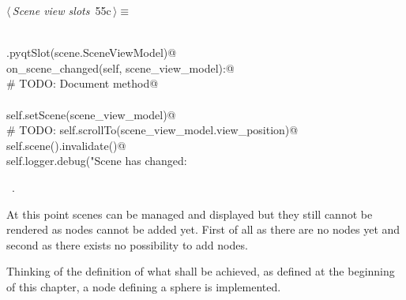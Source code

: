 \documentclass[
    a4paper,      %
    10pt,         %
    openright,    %
    notitlepage,  %
    parskip=half, %
]{scrreprt}       %
\theoremstyle{definition}                    %
\begin{document}
\begin{flushleft} \small
\begin{minipage}{\linewidth}\label{scrap89}\raggedright\small
{} $\langle\,${\itshape Scene view slots}\nobreak\ {\footnotesize {55c}}$\,\rangle\equiv$
\vspace{-1ex}
\begin{list}{}{} \item
\mbox{}\lstinline@@\\
\mbox{}\lstinline@QtCore.pyqtSlot(scene.SceneViewModel)@\\
\mbox{}\lstinline@def on_scene_changed(self, scene_view_model):@\\
\mbox{}\lstinline@    # TODO: Document method@\\
\mbox{}\lstinline@@\\
\mbox{}\lstinline@    self.setScene(scene_view_model)@\\
\mbox{}\lstinline@    # TODO: self.scrollTo(scene_view_model.view_position)@\\
\mbox{}\lstinline@    self.scene().invalidate()@\\
\mbox{}\lstinline@    self.logger.debug("Scene has changed: %s", scene_view_model)@{\NWsep}
\end{list}
\vspace{-1.5ex}
\footnotesize
\begin{list}{}{\setlength{\itemsep}{-\parsep}\setlength{\itemindent}{-\leftmargin}}
\item \NWtxtMacroRefIn\ .

\item{}
\end{list}
\end{minipage}\vspace{4ex}
\end{flushleft}
At this point scenes can be managed and displayed but they still cannot be
rendered as nodes cannot be added yet. First of all as there are no nodes yet
and second as there exists no possibility to add nodes.

Thinking of the definition of what shall be achieved, as defined at the
beginning of this chapter, a node defining a sphere is implemented.
\end{document}
